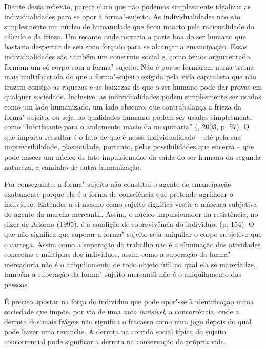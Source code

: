 Diante dessa reflexão, parece claro que não podemos simplesmente
idealizar as individualidades para se opor à forma"-sujeito. As
individualidades não são simplesmente um núcleo de humanidade que ficou
intacto pela racionalidade do cálculo e da frieza. Um recanto onde
moraria a parte boa do ser humano que bastaria despertar de seu sono
forçado para se alcançar a emancipação. Essas individualidades são
também um construto social e, como temos argumentado, formam um só corpo com
a forma"-sujeito. Não é por se formarem numa trama mais multifacetada do
que a forma"-sujeito exigida pela vida capitalista que não trazem consigo
as riquezas e as baixezas de que o ser humano pode dar provas em
qualquer sociedade. Inclusive, as individualidades podem simplesmente
ser usadas como um lado humanizado, um lado obscuro, que contrabalança a
frieza da forma"-sujeito, ou seja, as qualidades humanas podem ser usadas
simplesmente como ``lubrificante para o andamento macio da maquinaria''
(, 2003, p. 57). O que importa ressaltar é o fato de que é
nessa individualidade -- até pela sua imprevisibilidade, plasticidade,
portanto, pelas possibilidades que encerra -- que pode nascer um núcleo
de fato impulsionador da saída do ser humano da segunda natureza, a
caminho de outra humanização.

Por conseguinte, a forma"-sujeito não constitui o agente de emancipação
exatamente porque ela é a forma de consciência que pretende agrilhoar o
indivíduo. Entender a si mesmo como sujeito significa vestir a máscara
subjetiva do agente da marcha mercantil. Assim, o núcleo impulsionador
da resistência, no dizer de Adorno (1995), é a condição de sobrevivência
do indivíduo. (p. 154). O que não significa que superar a forma"-sujeito
seja aniquilar o corpo subjetivo que o carrega. Assim como a superação
do trabalho não é a eliminação das atividades concretas e múltiplas dos
indivíduos, assim como a superação da forma"-mercadoria não é o
aniquilamento de todo objeto útil no qual ela se materialize, também a
superação da forma"-sujeito mercantil não é o aniquilamento das pessoas.

É preciso apostar na força do indivíduo que pode opor"-se à identificação
numa sociedade que impõe, por via de uma \emph{mão invisível}, a
concorrência, onde a derrota dos mais frágeis não significa o fracasso
como num jogo depois do qual pode haver uma revanche. A derrota na
corrida social típica do sujeito concorrencial pode significar a derrota
na conservação da própria vida.

